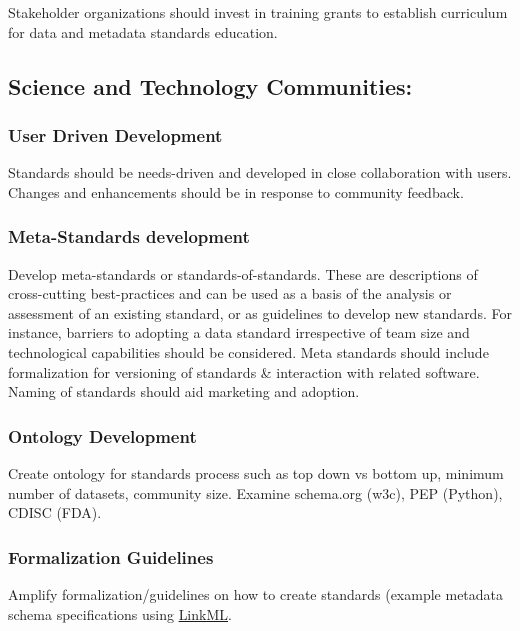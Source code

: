 \documentclass[
  letterpaper,
  DIV=11,
  numbers=noendperiod]{scrartcl}
\begin{document}
Stakeholder organizations should invest in training grants to establish
curriculum for data and metadata standards education.

\subsection{Science and Technology
Communities:}\label{science-and-technology-communities}

\subsubsection{User Driven Development}\label{user-driven-development}

Standards should be needs-driven and developed in close collaboration
with users. Changes and enhancements should be in response to community
feedback.

\subsubsection{Meta-Standards
development}\label{meta-standards-development}

Develop meta-standards or standards-of-standards. These are descriptions
of cross-cutting best-practices and can be used as a basis of the
analysis or assessment of an existing standard, or as guidelines to
develop new standards. For instance, barriers to adopting a data
standard irrespective of team size and technological capabilities should
be considered. Meta standards should include formalization for
versioning of standards \& interaction with related software. Naming of
standards should aid marketing and adoption.

\subsubsection{Ontology Development}\label{ontology-development}

Create ontology for standards process such as top down vs bottom up,
minimum number of datasets, community size. Examine schema.org (w3c),
PEP (Python), CDISC (FDA).

\subsubsection{Formalization Guidelines}\label{formalization-guidelines}

Amplify formalization/guidelines on how to create standards (example
metadata schema specifications using \href{https://linkml.io}{LinkML}.
\end{document}
